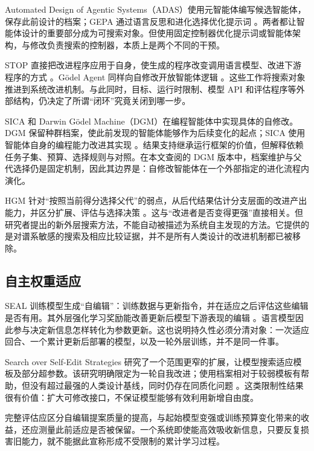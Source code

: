 \documentclass[11pt,,]{article}
\begin{document}
Automated Design of Agentic
Systems（ADAS）使用元智能体编写候选智能体，保存此前设计的档案；GEPA
通过语言反思和进化选择优化提示词
\citep{adas2024, gepa2025}。两者都让智能体设计的重要部分成为可搜索对象。但使用固定控制器优化提示词或智能体架构，与修改负责搜索的控制器，本质上是两个不同的干预。

STOP
直接把改进程序应用于自身，使生成的程序改变调用语言模型、改进下游程序的方式
\citep{stop2023}。Gödel Agent 同样向自修改开放智能体逻辑
\citep{goedelagent2024}。这些工作将搜索对象推进到系统改进机制。与此同时，目标、运行时限制、模型
API 和评估程序等外部结构，仍决定了所谓``闭环''究竟关闭到哪一步。

SICA 和 Darwin Gödel Machine（DGM）在编程智能体中实现具体的自修改。DGM
保留种群档案，使此前发现的智能体能够作为后续变化的起点；SICA
使用智能体自身的编程能力改进其实现
\citep{sica2025, dgm2025}。结果支持继承运行框架的价值，但解释依赖任务子集、预算、选择规则与对照。在本文查阅的
DGM
版本中，档案维护与父代选择仍是固定机制，因此其边界是：自修改智能体在一个外部指定的进化流程内演化。

HGM
针对``按照当前得分选择父代''的弱点，从后代结果估计分支层面的改进产出能力，并区分扩展、评估与选择决策
\citep{hgm2025}。这与``改进者是否变得更强''直接相关。但研究者提出的新外层搜索方法，不能自动被描述为系统自主发现的方法。它提供的是对谱系敏感的搜索及相应比较证据，并不是所有人类设计的改进机制都已被移除。

\hypertarget{ux81eaux4e3bux6743ux91cdux9002ux5e94}{%
\subsection{自主权重适应}\label{ux81eaux4e3bux6743ux91cdux9002ux5e94}}

SEAL
训练模型生成``自编辑''：训练数据与更新指令，并在适应之后评估这些编辑是否有用。其外层强化学习奖励能改善更新后模型下游表现的编辑
\citep{seal2025}。语言模型因此参与决定新信息怎样转化为参数更新。这也说明持久性必须分清对象：一次适应回合、一个累计更新后部署的模型，以及一轮外层训练，并不是同一件事。

Search over Self-Edit Strategies
研究了一个范围更窄的扩展，让模型搜索适应模板及部分超参数。该研究明确限定为一轮自我改进；使用档案相对于较弱模板有帮助，但没有超过最强的人类设计基线，同时仍存在同质化问题
\citep{selfedit2026}。这类限制性结果很有价值：扩大可修改接口，不保证模型能够有效利用新增自由度。

完整评估应区分自编辑提案质量的提高，与起始模型变强或训练预算变化带来的收益，还应测量此前适应是否被保留。一个系统即使能高效吸收新信息，只要反复损害旧能力，就不能据此宣称形成不受限制的累计学习过程。
\end{document}
